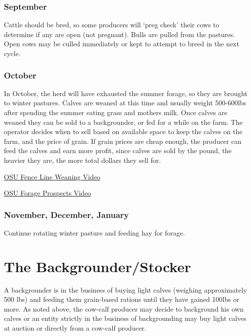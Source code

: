 \documentclass[
  letterpaper,
  DIV=11,
  numbers=noendperiod]{scrreprt}
\begin{document}
\hypertarget{september}{%
\subsubsection{September}\label{september}}

Cattle should be bred, so some producers will `preg check' their cows to
determine if any are open (not pregnant). Bulls are pulled from the
pastures. Open cows may be culled immediately or kept to attempt to
breed in the next cycle.

\hypertarget{october}{%
\subsubsection{October}\label{october}}

In October, the herd will have exhausted the summer forage, so they are
brought to winter pastures. Calves are weaned at this time and usually
weight 500-600lbs after spending the summer eating grass and mothers
milk. Once calves are weaned they can be sold to a backgrounder, or fed
for a while on the farm. The operator decides when to sell based on
available space to keep the calves on the farm, and the price of grain.
If grain prices are cheap enough, the producer can feed the calves and
earn more profit, since calves are sold by the pound, the heavier they
are, the more total dollars they sell for.

\href{https://www.youtube.com/watch?v=qpGuOOA-fYU}{OSU Fence Line
Weaning Video}

\href{https://www.youtube.com/watch?v=JyvTl9PVdMQ\#action=share}{OSU
Forage Prospects Video}

\hypertarget{november-december-january}{%
\subsubsection{November, December,
January}\label{november-december-january}}

Continue rotating winter pasture and feeding hay for forage.

\hypertarget{the-backgrounderstocker}{%
\section{The Backgrounder/Stocker}\label{the-backgrounderstocker}}

A backgrounder is in the business of buying light calves (weighing
approximately 500 lbs) and feeding them grain-based rations until they
have gained 100lbs or more. As noted above, the cow-calf producer may
decide to background his own calves or an entity strictly in the
business of backgrounding may buy light calves at auction or directly
from a cow-calf producer.
\end{document}
